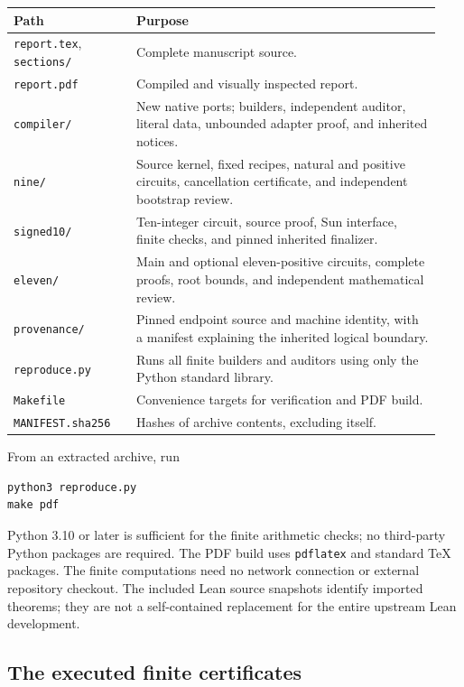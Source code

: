 \begin{longtable}{@{}p{0.27\linewidth}p{0.67\linewidth}@{}}
\toprule
Path & Purpose\\
\midrule
\endhead
\texttt{report.tex}, \texttt{sections/} & Complete manuscript source.\\
\texttt{report.pdf} & Compiled and visually inspected report.\\
\texttt{compiler/} & New native ports; builders, independent auditor,
literal data, unbounded adapter proof, and inherited notices.\\
\texttt{nine/} & Source kernel, fixed recipes, natural and positive
circuits, cancellation certificate, and independent bootstrap review.\\
\texttt{signed10/} & Ten-integer circuit, source proof, Sun interface,
finite checks, and pinned inherited finalizer.\\
\texttt{eleven/} & Main and optional eleven-positive circuits, complete
proofs, root bounds, and independent mathematical review.\\
\texttt{provenance/} & Pinned endpoint source and machine identity,
with a manifest explaining the inherited logical boundary.\\
\texttt{reproduce.py} & Runs all finite builders and auditors using
only the Python standard library.\\
\texttt{Makefile} & Convenience targets for verification and PDF build.\\
\texttt{MANIFEST.sha256} & Hashes of archive contents, excluding itself.\\
\bottomrule
\end{longtable}

From an extracted archive, run
\begin{verbatim}
python3 reproduce.py
make pdf
\end{verbatim}
Python 3.10 or later is sufficient for the finite arithmetic checks;
no third-party Python packages are required. The PDF build uses
\texttt{pdflatex} and standard TeX packages. The finite computations
need no network connection or external repository checkout. The
included Lean source snapshots identify imported theorems; they are
not a self-contained replacement for the entire upstream Lean
development.

\subsection{The executed finite certificates}

